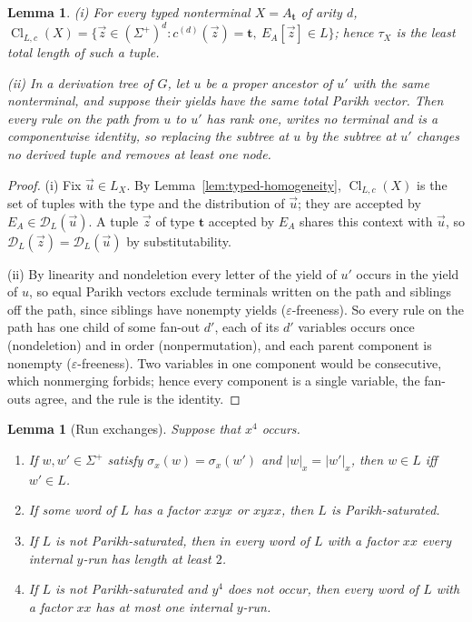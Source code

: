 \documentclass[11pt]{article}
\numberwithin{equation}{section}
\theoremstyle{plain}
\newtheorem{lemma}[theorem]{Lemma}
\theoremstyle{definition}
\theoremstyle{remark}
\newcommand{\D}{\mathcal{D}}
\newcommand{\tuple}[1]{\vec{#1}}
\newcommand{\eps}{\varepsilon}
\theoremstyle{plain}
\begin{document}
\begin{lemma}\label{lem:app-two-basic}
\textup{(i)} For every typed nonterminal $X=A_{\mathbf t}$ of arity $d$,
$\operatorname{Cl}_{L,c}(X)=\{\tuple z\in(\Sigma^+)^d:c^{(d)}(\tuple z)=\mathbf t,\
E_A[\tuple z]\in L\}$; hence $\tau_X$ is the least total length of such a tuple.

\textup{(ii)} In a derivation tree of $G$, let $u$ be a proper ancestor of $u'$
with the same nonterminal, and suppose their yields have the same total Parikh
vector.  Then every rule on the path from $u$ to $u'$ has rank one, writes no
terminal and is a componentwise identity, so replacing the subtree at $u$ by the
subtree at $u'$ changes no derived tuple and removes at least one node.
\end{lemma}

\begin{proof}
(i) Fix $\tuple u\in L_X$.  By Lemma~\ref{lem:typed-homogeneity},
$\operatorname{Cl}_{L,c}(X)$ is the set of tuples with the type and the
distribution of $\tuple u$; they are accepted by $E_A\in\D_L(\tuple u)$.  A tuple
$\tuple z$ of type $\mathbf t$ accepted by $E_A$ shares this context with $\tuple u$,
so $\D_L(\tuple z)=\D_L(\tuple u)$ by substitutability.

(ii) By linearity and nondeletion every letter of the yield of $u'$ occurs in the
yield of $u$, so equal Parikh vectors exclude terminals written on the path
and siblings off the path, since siblings have nonempty yields
($\eps$-freeness).  So every rule on the path has one child of some fan-out
$d'$, each of its $d'$ variables occurs once (nondeletion) and in order
(nonpermutation), and each parent component is nonempty ($\eps$-freeness).
Two variables in one component would be consecutive, which nonmerging forbids;
hence every component is a single variable, the fan-outs agree, and the rule is
the identity.
\end{proof}

\begin{lemma}[Run exchanges]\label{lem:app-two-runs}
Suppose that $x^4$ occurs.
\begin{enumerate}[label=\textup{(\roman*)},leftmargin=*]
\item If $w,w'\in\Sigma^+$ satisfy $\sigma_x(w)=\sigma_x(w')$ and
$|w|_x=|w'|_x$, then $w\in L$ iff $w'\in L$.
\item If some word of $L$ has a factor $xxyx$ or $xyxx$, then $L$ is
Parikh-saturated.
\item If $L$ is not Parikh-saturated, then in every word of $L$ with a factor
$xx$ every internal $y$-run has length at least $2$.
\item If $L$ is not Parikh-saturated and $y^4$ does not occur, then every word
of $L$ with a factor $xx$ has at most one internal $y$-run.
\end{enumerate}
\end{lemma}
\end{document}
